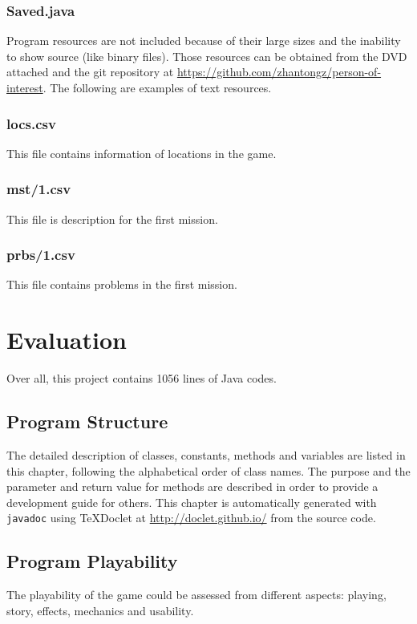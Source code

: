 \documentclass[letterpaper, 12pt]{report}
\begin{document}
\section{Saved.java}


Program resources are not included because of their large sizes and the inability to show source (like binary files). Those resources can be obtained from the DVD attached and the git repository at \url{https://github.com/zhantongz/person-of-interest}. The following are examples of text resources.
\section{locs.csv}
This file contains information of locations in the game.


\section{mst/1.csv}
This file is description for the first mission.


\section{prbs/1.csv}
This file contains problems in the first mission.

\part{Evaluation}
Over all, this project contains 1056 lines of Java codes.
\chapter{Program Structure}
The detailed description of classes, constants, methods and variables are listed in this chapter, following the alphabetical order of class names. The purpose and the parameter and return value for methods are described in order to provide a development guide for others. This chapter is automatically generated with \texttt{javadoc} using TeXDoclet at \url{http://doclet.github.io/} from the source code.

\chapter{Program Playability}
The playability of the game could be assessed from different aspects: playing, story, effects, mechanics and usability.
\end{document}
